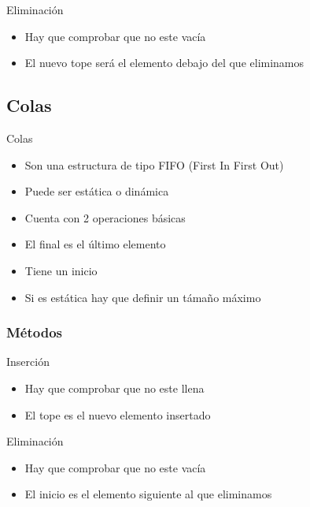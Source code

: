 \documentclass{beamer}
\begin{document}
\begin{frame}{Eliminaci\'on}
	\begin{itemize}
		\item Hay que comprobar que no este vac\'ia
		\item El nuevo tope ser\'a el elemento debajo del que eliminamos
	\end{itemize}
	\centering
\end{frame}

\subsection{Colas}

\begin{frame}{Colas}
	\begin{itemize}
		\item Son una estructura de tipo FIFO (First In First Out)
		\item Puede ser est\'atica o din\'amica
		\item Cuenta con 2 operaciones b\'asicas
		\item El final es el \'ultimo elemento
		\item Tiene un inicio
		\item Si es est\'atica hay que definir un t\'amaño m\'aximo
	\end{itemize}
\end{frame}

\subsubsection{M\'etodos}

\begin{frame}{Inserci\'on}
	\begin{itemize}
		\item Hay que comprobar que no este llena
		\item El tope es el nuevo elemento insertado
	\end{itemize}
	\centering
\end{frame}

\begin{frame}{Eliminaci\'on}
	\begin{itemize}
		\item Hay que comprobar que no este vac\'ia
		\item El inicio es el elemento siguiente al que eliminamos
	\end{itemize}
	\centering
\end{frame}
\end{document}
